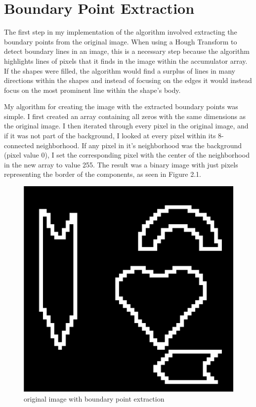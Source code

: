 \documentclass[paper=a4, fontsize=11pt]{scrartcl} %
\numberwithin{equation}{section} %
\numberwithin{figure}{section} %
\numberwithin{table}{section} %
\begin{document}
\restoregeometry

\section{Boundary Point Extraction}

The first step in my implementation of the algorithm involved extracting the boundary points from the original image. When using a Hough Transform to detect boundary lines in an image, this is a necessary step because the algorithm highlights lines of pixels that it finds in the image within the accumulator array. If the shapes were filled, the algorithm would find a surplus of lines in many directions within the shapes and instead of focusing on the edges it would instead focus on the most prominent line within the shape's body.

My algorithm for creating the image with the extracted boundary points was simple. I first created an array containing all zeros with the same dimensions as the original image. I then iterated through every pixel in the original image, and if it was not part of the background, I looked at every pixel within its 8-connected neighborhood. If any pixel in it's neighborhood was the background (pixel value 0), I set the corresponding pixel with the center of the neighborhood in the new array to value 255. The result was a binary image with just pixels representing the border of the components, as seen in Figure 2.1.

\begin{figure}[H]
  \centering
  \begin{minipage}[b]{0.45\textwidth}
    \includegraphics[width=\textwidth]{extracted_boundary_points.png}
    \caption{original image with boundary point extraction}
  \end{minipage}
\end{figure}
\end{document}
